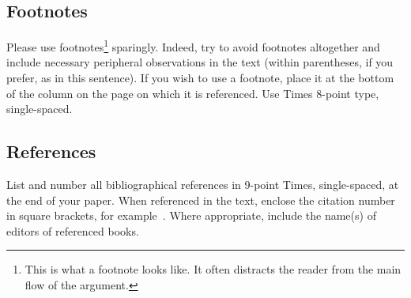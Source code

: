 \documentclass[10pt,twocolumn,letterpaper]{article}
\begin{document}
\subsection{Footnotes}

Please use footnotes\footnote {This is what a footnote looks like.  It
often distracts the reader from the main flow of the argument.} sparingly.
Indeed, try to avoid footnotes altogether and include necessary peripheral
observations in
the text (within parentheses, if you prefer, as in this sentence).  If you
wish to use a footnote, place it at the bottom of the column on the page on
which it is referenced. Use Times 8-point type, single-spaced.


\subsection{References}

List and number all bibliographical references in 9-point Times,
single-spaced, at the end of your paper. When referenced in the text,
enclose the citation number in square brackets, for
example~\cite{Authors14}.  Where appropriate, include the name(s) of
editors of referenced books.
\end{document}
